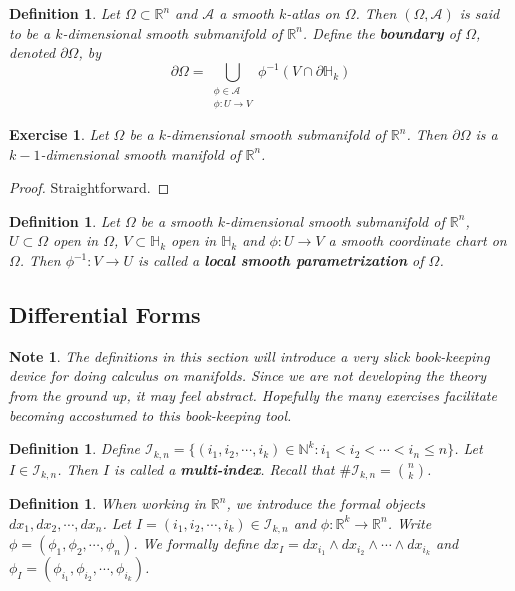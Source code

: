 \documentclass[12pt]{amsart}
\newtheorem{defn}[thm]{Definition}
\newtheorem{note}[thm]{Note}
\newtheorem{ex}[thm]{Exercise}
\newcommand{\Om}{\Omega}
\newcommand{\N}{\mathbb{N}}
\renewcommand{\H}{\mathbb{H}}
\newcommand{\R}{\mathbb{R}}
\newcommand{\MA}{\mathcal{A}}
\newcommand{\MI}{\mathcal{I}}
\begin{document}
	\begin{defn}
		Let $\Om \subset \R^n$ and $\MA$ a smooth $k$-atlas on $\Om$. Then $(\Om, \MA)$ is said to be a $k$-dimensional smooth submanifold of $\R^n$. Define the \textbf{boundary} of $\Om$, denoted $\partial \Om$, by $$\partial \Om = \bigcup_{\substack{\phi \in \MA \\ \phi:U \rightarrow V}} \phi^{-1}(V \cap \partial \H_k) $$
	\end{defn}
	
	\begin{ex}
		Let $\Om$ be a $k$-dimensional smooth submanifold of $\R^n$. Then $\partial \Om$ is a $k-1$-dimensional smooth manifold of $\R^n$.
	\end{ex}
	
	\begin{proof}
		Straightforward.
	\end{proof}
	
	\begin{defn}
		Let $\Om$ be a smooth $k$-dimensional smooth submanifold of $\R^n$, $U \subset \Om$ open in $\Om$, $V \subset \H_k$ open in $\H_k$ and $\phi: U \rightarrow V$ a smooth coordinate chart on $\Om$. Then $\phi^{-1}: V \rightarrow U$ is called a \textbf{local smooth parametrization} of $\Om$. 
	\end{defn}
	
	\subsection{Differential Forms}
	
	\begin{note}
		The definitions in this section will introduce a very slick book-keeping device for doing calculus on manifolds. Since we are not developing the theory from the ground up, it may feel abstract. Hopefully the many exercises facilitate becoming accostumed to this book-keeping tool.
	\end{note}
	
	\begin{defn}
		Define $\MI_{k, n} = \{(i_1, i_2, \cdots, i_k) \in \N^k: i_1 < i_2 < \cdots < i_n \leq n \}$. Let $I \in \MI_{k,n}$. Then $I$ is called a \textbf{multi-index}. Recall that $\# \MI_{k,n} = {n \choose k}$.
	\end{defn}
	
	\begin{defn}
		When working in $\R^n$, we introduce the formal objects $dx_1, dx_2, \cdots, dx_n$. Let $I = (i_1, i_2, \cdots, i_k)\in \MI_{k,n}$ and $\phi: \R^k \rightarrow \R^n$. Write $\phi = (\phi_1, \phi_2, \cdots, \phi_n)$. We formally define $dx_I = dx_{i_1}\wedge dx_{i_2} \wedge \cdots \wedge dx_{i_k}$ and $\phi_I = (\phi_{i_1}, \phi_{i_2}, \cdots, \phi_{i_k})$.   
	\end{defn}
	
\end{document}
